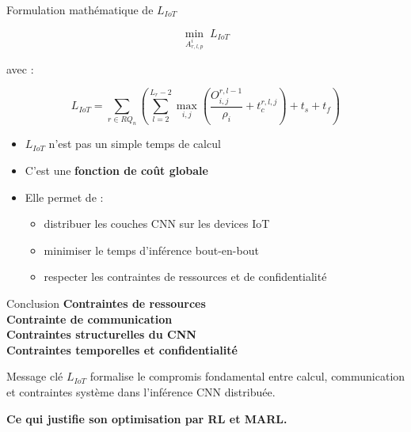 \documentclass{beamer}
\begin{document}
\begin{frame}{Formulation mathématique de $L_{IoT}$}

\[
\min_{A_{r,l,p}^i} \; L_{IoT}
\]

avec :

\[
L_{IoT} =
\sum_{r \in RQ_n}
\left(
\sum_{l=2}^{L_r-2}
\max_{i,j}
\left(
\frac{O^{r,l-1}_{i,j}}{\rho_i}
+
t^{r,l,j}_c
\right)
+ t_s + t_f
\right)
\]

\begin{itemize}
  \item $L_{IoT}$ n’est pas un simple temps de calcul
  \item C’est une \textbf{fonction de coût globale}
  \item Elle permet de :
  \begin{itemize}
    \item distribuer les couches CNN sur les devices IoT
    \item minimiser le temps d’inférence bout-en-bout
    \item respecter les contraintes de ressources et de confidentialité
  \end{itemize}
\end{itemize}
\end{frame}

\begin{frame}{Conclusion}
\footnotesize
\textbf{Contraintes de ressources} \\
\medskip
\textbf{Contrainte de communication} \\
\medskip
\textbf{Contraintes structurelles du CNN} \\
\medskip
\textbf{Contraintes temporelles et confidentialité}

\begin{block}{Message clé}
$L_{IoT}$ formalise le compromis fondamental entre calcul, communication et contraintes système dans l’inférence CNN distribuée.
\end{block}

\bigskip
\centering
\textbf{Ce qui justifie son optimisation par RL et MARL.}
\end{frame}
\end{document}
